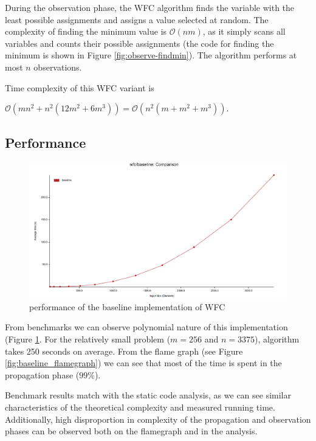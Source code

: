 \documentclass[shortabstract, english, inz]{iithesis}
\begin{document}
During the observation phase, the WFC algorithm finds the variable with the least possible assignments and assigns a value selected at random. The complexity of finding the minimum value is \(\mathcal{O}(nm)\), as it simply scans all variables and counts their possible assignments (the code for finding the minimum is shown in Figure \ref{fig:observe-findmin}). The algorithm performs at most \(n\) observations.


Time complexity of this WFC variant is

\(\mathcal{O}(mn^2 + n^2(12m^2 + 6m^3)) = \mathcal{O}(n^2(m + m^2 + m^3))\).


\subsection{Performance}
\begin{figure}[H]
\centering
\includegraphics[width=1\textwidth, angle=0]{images/baseline_performance.png}
\caption{performance of the baseline implementation of WFC}
\label{fig:baseline_performance}
\end{figure}

From benchmarks we can observe polynomial nature of this implementation (Figure \ref{fig:baseline_performance}. For the relatively small problem (\(m=256\) and \(n=3375\)), algorithm takes 250 seconds on average. From the flame graph (see Figure \ref{fig:baseline_flamegraph}) we can see that most of the time is spent in the propagation phase (\(99\%\)).

Benchmark results match with the static code analysis, as we can see similar characteristics of the theoretical complexity and measured running time. Additionally, high disproportion in complexity of the propagation and observation phases can be observed both on the flamegraph and in the analysis.
\end{document}
